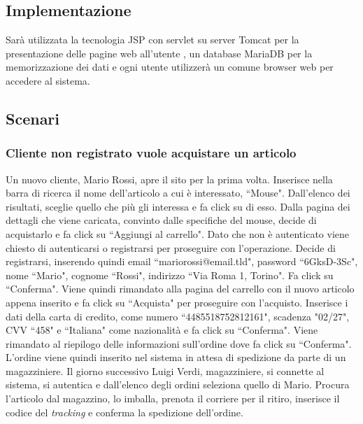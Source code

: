 \documentclass[12pt]{article}
\begin{document}
\subsection{Implementazione}
Sarà utilizzata la tecnologia JSP con servlet su server Tomcat per la presentazione delle pagine web all'utente , un database MariaDB per la memorizzazione dei dati e ogni utente utilizzerà un comune browser web per accedere al sistema.

\newpage
\subsection{Scenari}
\subsubsection{Cliente non registrato vuole acquistare un articolo}
Un nuovo cliente, Mario Rossi, apre il sito per la prima volta.
Inserisce nella barra di ricerca il nome dell'articolo a cui è interessato, ``Mouse".
Dall'elenco dei risultati, sceglie quello che più gli interessa e fa click su di esso.
Dalla pagina dei dettagli che viene caricata, convinto dalle specifiche del mouse, decide di acquistarlo e fa click su ``Aggiungi al carrello".
Dato che non è autenticato viene chiesto di autenticarsi o registrarsi per proseguire con l'operazione.
Decide di registrarsi, inserendo quindi email ``mariorossi@email.tld", password ``6GksD-3Sc", nome ``Mario", cognome ``Rossi", indirizzo ``Via Roma 1, Torino". Fa click su ``Conferma".
Viene quindi rimandato alla pagina del carrello con il nuovo articolo appena inserito e fa click su ``Acquista" per proseguire con l'acquisto.
Inserisce i dati della carta di credito, come numero  ``4485518752812161", scadenza "02/27", CVV ``458" e ``Italiana" come nazionalità e fa click su ``Conferma".
Viene rimandato al riepilogo delle informazioni sull'ordine dove fa click su ``Conferma".
L'ordine viene quindi inserito nel sistema in attesa di spedizione da parte di un magazziniere.
Il giorno successivo Luigi Verdi, magazziniere, si connette al sistema, si autentica e dall'elenco degli ordini seleziona quello di Mario. Procura l'articolo dal magazzino, lo imballa, prenota il corriere per il ritiro, inserisce il codice del \emph{tracking} e conferma la spedizione dell'ordine.
\end{document}
